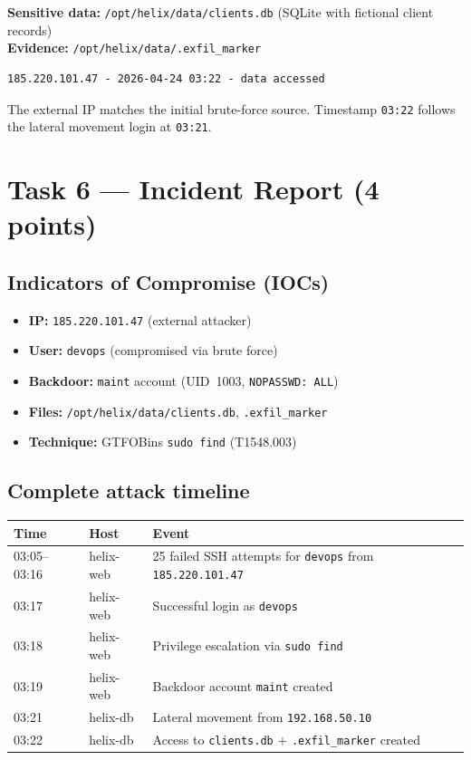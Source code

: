 \documentclass[a4paper, 12pt]{article}
\begin{document}
\textbf{Sensitive data:} \texttt{/opt/helix/data/clients.db} (SQLite with fictional client records)\\
\textbf{Evidence:} \texttt{/opt/helix/data/.exfil\_marker}

\begin{lstlisting}
185.220.101.47 - 2026-04-24 03:22 - data accessed
\end{lstlisting}

The external IP matches the initial brute-force source. Timestamp \texttt{03:22}
follows the lateral movement login at \texttt{03:21}.

\section{Task 6 --- Incident Report (4 points)}

\subsection*{Indicators of Compromise (IOCs)}
\begin{itemize}[leftmargin=1.5em]
  \item \textbf{IP:} \texttt{185.220.101.47} (external attacker)
  \item \textbf{User:} \texttt{devops} (compromised via brute force)
  \item \textbf{Backdoor:} \texttt{maint} account (UID~1003, \texttt{NOPASSWD: ALL})
  \item \textbf{Files:} \texttt{/opt/helix/data/clients.db}, \texttt{.exfil\_marker}
  \item \textbf{Technique:} GTFOBins \texttt{sudo find} (T1548.003)
\end{itemize}

\subsection*{Complete attack timeline}
\begin{table}[H]
\centering
\begin{tabularx}{\textwidth}{llX}
\toprule
\textbf{Time} & \textbf{Host} & \textbf{Event} \\
\midrule
03:05--03:16 & helix-web & 25 failed SSH attempts for \texttt{devops} from \texttt{185.220.101.47} \\
03:17        & helix-web & Successful login as \texttt{devops} \\
03:18        & helix-web & Privilege escalation via \texttt{sudo find} \\
03:19        & helix-web & Backdoor account \texttt{maint} created \\
03:21        & helix-db  & Lateral movement from \texttt{192.168.50.10} \\
03:22        & helix-db  & Access to \texttt{clients.db} + \texttt{.exfil\_marker} created \\
\bottomrule
\end{tabularx}
\end{table}
\end{document}
